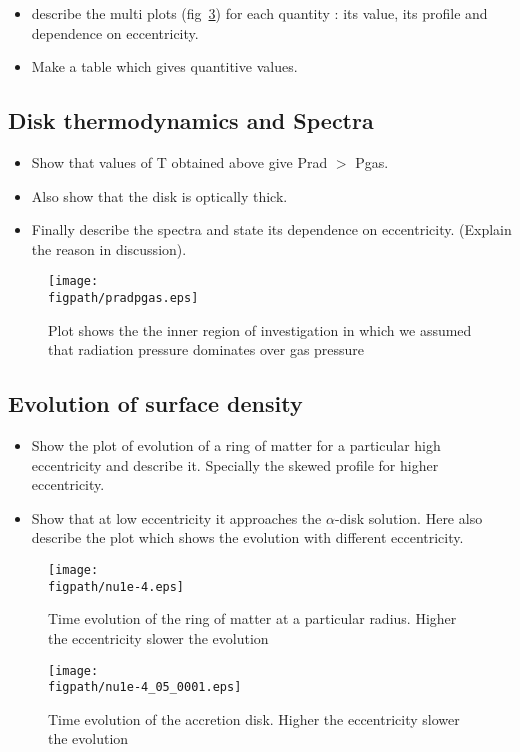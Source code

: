 \documentclass[useAMS,usenatbib]{mn2e}
\newcommand{\figpath}{./Figs/}
\begin{document}
\begin{itemize}
\item describe the multi plots (fig~\ref{fig:steadyplt1}) for each quantity : its value, its
  profile and dependence on eccentricity.
\item Make a table which gives quantitive values.  
\end{itemize}
\subsection{Disk thermodynamics and Spectra}
\begin{itemize}
\item Show that values of T obtained above give Prad $>$ Pgas. 
\item Also show that the disk is optically thick.
\item Finally describe the spectra and state its dependence on
  eccentricity. (Explain the reason in discussion).
\end{itemize}
\begin{figure}
\centering
\texttt{[image: \\figpath/pradpgas.eps]}
\caption{Plot shows the the inner region of investigation in which we assumed that radiation pressure dominates over gas pressure}
\label{fig:steadyplt1}
\end{figure}
\subsection{Evolution of surface density}
\begin{itemize}
\item Show the plot of evolution of a ring of matter for a particular high
  eccentricity and describe it. Specially the skewed profile for
  higher eccentricity. 
\item Show that at low eccentricity it approaches the $\alpha$-disk
  solution. Here also describe the plot which shows the evolution with
  different eccentricity. 
\end{itemize}
\begin{figure}
\centering
\texttt{[image: \\figpath/nu1e-4.eps]}
\caption{Time evolution of the ring of matter at a particular radius. Higher the eccentricity slower the evolution}
\label{fig:steadyplt1}
\end{figure}
\begin{figure}
\centering
\texttt{[image: \\figpath/nu1e-4\_05\_0001.eps]}
\caption{Time evolution of the accretion disk. Higher the eccentricity slower the evolution}
\label{fig:steadyplt1}
\end{figure}
\end{document}
